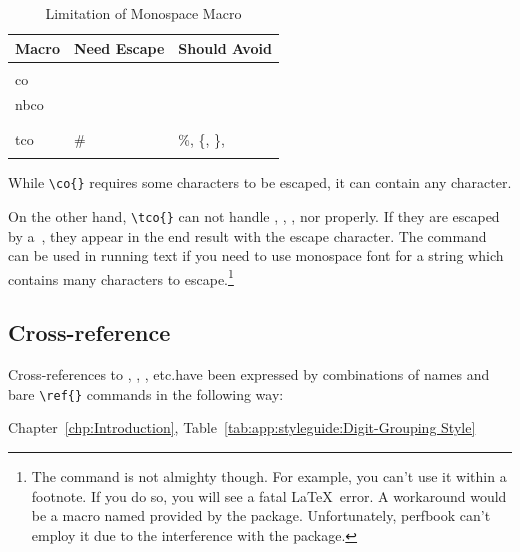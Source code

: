 \begin{table}
\renewcommand*{\arraystretch}{1.2}\centering\footnotesize
\begin{tabular}{@{}lll@{}}\toprule
  Macro &  Need Escape & Should Avoid \\
  \midrule
  \co{\\co}, \co{\\nbco} & \co{\\}, \%, \{, \} & \\
  \co{\\tco}  & \# & \%, \{, \}, \co{\\} \\
  \bottomrule
\end{tabular}
\caption{Limitation of Monospace Macro}
\label{tab:app:styleguide:Limitation of Monospace Macro}
\end{table}

While \verb|\co{}| requires some characters to be escaped,
it can contain any character.

On the other hand, \verb|\tco{}| can not handle
\qco{\%}, \qco{\{}, \qco{\}}, nor \qco{\\} properly.
If they are escaped by a~\qco{\\},
they appear in the end result with the escape character.
The \qco{\\verb} command can be used in running text if you
need to use monospace font for a string which contains
many characters to escape.\footnote{
  The \co{\\verb} command is not almighty though.
  For example, you can't use it within a footnote.
  If you do so, you will see a fatal \LaTeX\ error.
  A workaround would be a macro named \co{\\VerbatimFootnotes}
  provided by the  package.
  Unfortunately, perfbook can't employ it due to the interference
  with the  package.
  }

\subsection{Cross-reference}
\label{sec:app:styleguide:Cross-Reference}

Cross-references to ,
,
, etc.\@ have
been expressed by combinations of names and bare \verb|\ref{}|
commands in the following way:

\begin{VerbatimN}
Chapter~\ref{chp:Introduction},
Table~\ref{tab:app:styleguide:Digit-Grouping Style}
\end{VerbatimN}

